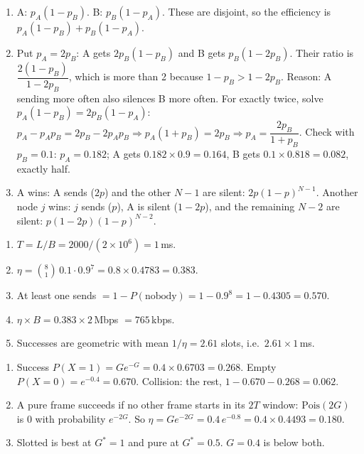 \begin{enumerate}
  \item[(a)] A: $p_A(1-p_B)$. B: $p_B(1-p_A)$. These are disjoint, so the efficiency is $p_A(1-p_B)+p_B(1-p_A)$.
  \item[(b)] Put $p_A=2p_B$: A gets $2p_B(1-p_B)$ and B gets $p_B(1-2p_B)$. Their ratio is $\dfrac{2(1-p_B)}{1-2p_B}$, which is more than 2 because $1-p_B>1-2p_B$.
  Reason: A sending more often also silences B more often.
  For exactly twice, solve $p_A(1-p_B)=2p_B(1-p_A)$: $p_A-p_Ap_B=2p_B-2p_Ap_B\Rightarrow p_A(1+p_B)=2p_B\Rightarrow p_A=\dfrac{2p_B}{1+p_B}$.
  Check with $p_B=0.1$: $p_A=0.182$; A gets $0.182\times0.9=0.164$, B gets $0.1\times0.818=0.082$, exactly half.
  \item[(c)] A wins: A sends ($2p$) and the other $N-1$ are silent: $2p(1-p)^{N-1}$. Another node $j$ wins: $j$ sends ($p$), A is silent ($1-2p$), and the remaining $N-2$ are silent: $p(1-2p)(1-p)^{N-2}$.
\end{enumerate}

\begin{enumerate}
  \item[(a)] $T=L/B=2000/(2\times10^6)=1$\,ms.
  \item[(b)] $\eta=\binom81\,0.1\cdot0.9^7=0.8\times0.4783=0.383$.
  \item[(c)] At least one sends $=1-P(\text{nobody})=1-0.9^8=1-0.4305=0.570$.
  \item[(d)] $\eta\times B=0.383\times2$\,Mbps $=765$\,kbps.
  \item[(e)] Successes are geometric with mean $1/\eta=2.61$ slots, i.e.\ $2.61\times1$\,ms.
\end{enumerate}

\begin{enumerate}
  \item[(a)] Success $P(X=1)=Ge^{-G}=0.4\times0.6703=0.268$. Empty $P(X=0)=e^{-0.4}=0.670$. Collision: the rest, $1-0.670-0.268=0.062$.
  \item[(b)] A pure frame succeeds if no other frame starts in its $2T$ window: $\text{Pois}(2G)$ is $0$ with probability $e^{-2G}$. So $\eta=Ge^{-2G}=0.4\,e^{-0.8}=0.4\times0.4493=0.180$.
  \item[(c)] Slotted is best at $G^*=1$ and pure at $G^*=0.5$. $G=0.4$ is below both.
\end{enumerate}

